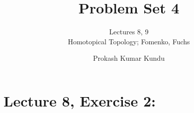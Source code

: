 \documentclass[11pt]{article}
\numberwithin{equation}{section}
\begin{document}
\newtheorem{thm}{Theorem}[section]
\newtheorem{ex}[thm]{Exercise}
\newtheorem{cor}[thm]{Corollary}
\newtheorem{lem}[thm]{Lemma}
\newtheorem{clm}[thm]{Claim}
\newtheorem{prop}[thm]{Proposition}
\newtheorem{rem}[thm]{Remark}
\newtheorem{rem*}{Remark}
\theoremstyle{definition}
\newtheorem{defn}{Definition}[section]
\newtheorem{eg}{Example}[section] 

\title{Problem Set 4}
    \author{Lectures 8, 9\\Homotopical Topology; Fomenko, Fuchs}
    \date{Prokash Kumar Kundu}
    \maketitle
    
\section{\normalsize{Lecture 8, Exercise 2:}}
\end{document}
